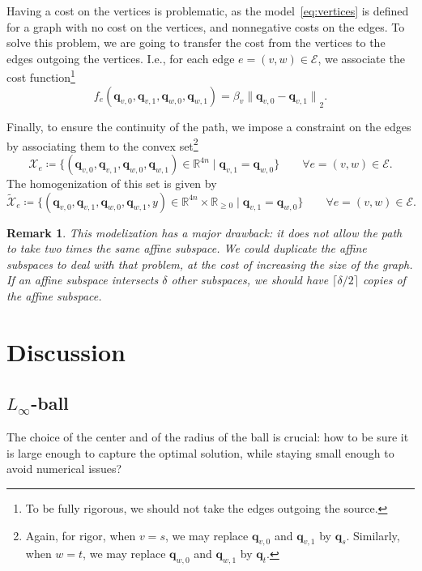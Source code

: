 \documentclass[a4paper, 12pt]{article}
\newlength{\indentsize}
\newtheorem*{remark}{Remark}
\begin{document}
\hspace{\indentsize} Having a cost on the vertices is problematic, as the model~\ref{eq:vertices} is defined for a graph with no cost on the vertices, and nonnegative costs on the edges. To solve this problem, we are going to transfer the cost from the vertices to the edges outgoing the vertices. I.e., for each edge $e = (v,w) \in \mathcal{E}$, we associate the cost function\footnote{To be fully rigorous, we should not take the edges outgoing the source.} \[f_e(\mathbf{q}_{v,0}, \mathbf{q}_{v,1}, \mathbf{q}_{w,0}, \mathbf{q}_{w,1}) = \beta_v {\lVert \mathbf{q}_{v,0} - \mathbf{q}_{v,1} \rVert}_2.\]

Finally, to ensure the continuity of the path, we impose a constraint on the edges by associating them to the convex set\footnote{Again, for rigor, when $v = s$, we may replace $\mathbf{q}_{v,0}$ and $\mathbf{q}_{v,1}$ by $\mathbf{q}_s$. Similarly, when $w = t$, we may replace $\mathbf{q}_{w,0}$ and $\mathbf{q}_{w,1}$ by $\mathbf{q}_t$.} \[\mathcal{X}_e \coloneq \{(\mathbf{q}_{v,0}, \mathbf{q}_{v,1}, \mathbf{q}_{w,0}, \mathbf{q}_{w,1}) \in \mathbb{R}^{4n} \mid \mathbf{q}_{v,1} = \mathbf{q}_{w,0}\} \qquad \forall e = (v,w) \in \mathcal{E}.\]
The homogenization of this set is given by \[\tilde{\mathcal{X}}_e \coloneq \{(\mathbf{q}_{v,0}, \mathbf{q}_{v,1}, \mathbf{q}_{w,0}, \mathbf{q}_{w,1}, y) \in \mathbb{R}^{4n} \times \mathbb{R}_{\geq 0} \mid \mathbf{q}_{v,1} = \mathbf{q}_{w,0}\} \qquad \forall e = (v,w) \in \mathcal{E}.\]

\begin{remark} This modelization has a major drawback: it does not allow the path to take two times the same affine subspace. We could duplicate the affine subspaces to deal with that problem, at the cost of increasing the size of the graph. If an affine subspace intersects $\delta$ other subspaces, we should have $\lceil \delta/2 \rceil$ copies of the affine subspace.\end{remark}

\section{Discussion}\label{sec:discussion}
\subsection{$L_\infty$-ball}
The choice of the center and of the radius of the ball is crucial: how to be sure it is large enough to capture the optimal solution, while staying small enough to avoid numerical issues?~\cite{Radius}
\end{document}
